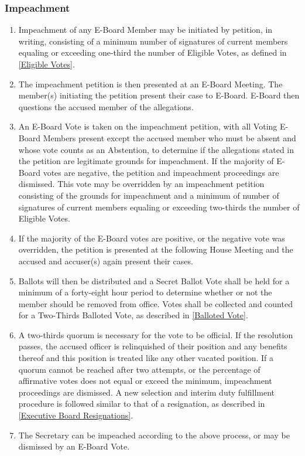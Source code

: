 \documentclass{article}
\newcommand{\asubsection}[1]{\subsubsection{#1} \label{#1}}
\begin{document}
\asubsection{Impeachment}
\begin{enumerate}
	\item Impeachment of any E-Board Member may be initiated by petition, in writing, consisting of a minimum number of signatures of current members equaling or exceeding one-third the number of Eligible Votes, as defined in \ref{Eligible Votes}.
	\item The impeachment petition is then presented at an E-Board Meeting.
	      The member(s) initiating the petition present their case to E-Board.
	      E-Board then questions the accused member of the allegations.
	\item An E-Board Vote is taken on the impeachment petition, with all Voting E-Board Members present except the accused member who must be absent and whose vote counts as an Abstention, to determine if the allegations stated in the petition are legitimate grounds for impeachment.
	      If the majority of E-Board votes are negative, the petition and impeachment proceedings are dismissed.
	      This vote may be overridden by an impeachment petition consisting of the grounds for impeachment and a minimum of number of signatures of current members equaling or exceeding two-thirds the number of Eligible Votes.
	\item If the majority of the E-Board votes are positive, or the negative vote was overridden, the petition is presented at the following House Meeting and the accused and accuser(s) again present their cases.
	\item Ballots will then be distributed and a Secret Ballot Vote shall be held for a minimum of a forty-eight hour period to determine whether or not the member should be removed from office.
	      Votes shall be collected and counted for a Two-Thirds Balloted Vote, as described in \ref{Balloted Vote}.
	\item A two-thirds quorum is necessary for the vote to be official.
	      If the resolution passes, the accused officer is relinquished of their position and any benefits thereof and this position is treated like any other vacated position.
	      If a quorum cannot be reached after two attempts, or the percentage of affirmative votes does not equal or exceed the minimum, impeachment proceedings are dismissed.
	      A new selection and interim duty fulfillment procedure is followed similar to that of a resignation, as described in \ref{Executive Board Resignations}.
	\item The Secretary can be impeached according to the above process, or may be dismissed by an E-Board Vote.
\end{enumerate}
\end{document}
